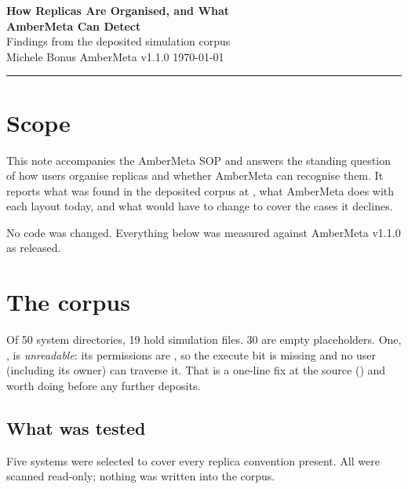 \documentclass[11pt]{article}
\begin{document}
\begin{center}
  {\LARGE\bfseries\color{amber} How Replicas Are Organised, and What\\[0.2em]
   AmberMeta Can Detect}\\[0.7em]
  {\large Findings from the deposited simulation corpus}\\[1.1em]
  {\small Michele Bonus \quad\textbullet\quad AmberMeta v1.1.0 \quad\textbullet\quad \today}
\end{center}
\vspace{0.6em}
\hrule
\vspace{1.3em}

\section{Scope}

This note accompanies the AmberMeta SOP and answers the standing question of how users
organise replicas and whether AmberMeta can recognise them. It reports what was found in
the deposited corpus at , what AmberMeta does with
each layout today, and what would have to change to cover the cases it declines.

No code was changed. Everything below was measured against AmberMeta v1.1.0 as released.

\section{The corpus}

Of 50 system directories, 19 hold simulation files. 30 are empty placeholders. One,
, is \emph{unreadable}: its permissions are , so the
execute bit is missing and no user (including its owner) can traverse it. That is a
one-line fix at the source () and worth doing before any further
deposits.

\subsection{What was tested}

Five systems were selected to cover every replica convention present. All were scanned
read-only; nothing was written into the corpus.
\end{document}
